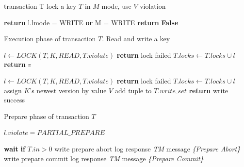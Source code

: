 \documentclass[conference]{IEEEtran}
\begin{document}
\begin{algorithm}[!h]
  \caption{transaction T lock a key ${T}$ in ${M}$ mode, use ${V}$ violation}
  \begin{algorithmic}[1]
      \State \textbf{return} l.lmode = WRITE \textbf{or} M = WRITE
    \EndIf
    \State \textbf{return} \textbf{False}
  \EndFunction
  \label{func:conflict}
  \end{algorithmic}

  \label{alg:lock}
\end{algorithm}


\begin{algorithm}[!h]

  \caption{Execution phase of transaction ${T}$. Read and write a key}

  \begin{algorithmic}[1]
    \State ${l \gets LOCK(T, K, READ, T.violate)}$
      \State \textbf{return} lock failed 
    \Else
      \State ${T.locks \gets T.locks \cup l}$
      \State \textbf{return} ${v}$
    \EndIf
  \EndFunction
  \label{func:read}
  \end{algorithmic}


  \begin{algorithmic}[1]
  \State ${l \gets LOCK(T, K, READ, T.violate)}$
    \State \textbf{return} lock failed
  \Else
    \State ${T.locks \gets T.locks \cup l}$
    \State assign ${K}$'s newest version by value ${V}$
    \State add tuple to ${T.write\_set}$
    \State \textbf{return} write success
  \EndIf
  \label{func:write}
  \EndFunction
  \end{algorithmic}
  \label{alg:execution_phase}
\end{algorithm}

\begin{algorithm}[!h]
  \caption{Prepare phase of transaction ${T}$}
  \begin{algorithmic}[1]
      \State ${l.violate = PARTIAL\_PREPARE}$
    \EndFor

    \State \textbf{wait} \textbf{if} ${T.in > 0}$
      \State write prepare abort log
      \State response \emph{TM} message \emph{\{Prepare Abort\}} 
      \State write prepare commit log
      \State response \emph{TM} message \emph{\{Prepare Commit\}} 
    \EndIf
  \EndFunction
  \end{algorithmic}
  \label{alg:prepare_phase}
\end{algorithm}
\end{document}
